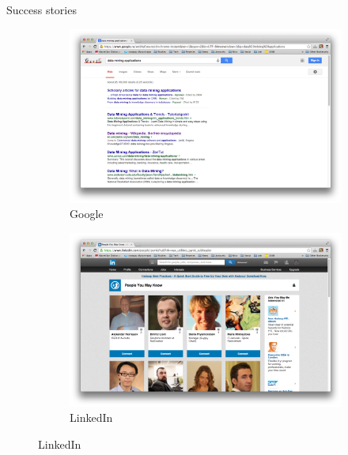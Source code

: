 \documentclass[10pt]{beamer}
\begin{document}
\begin{frame}{Success stories}

\begin{figure}
        \centering
        \begin{subfigure}[b]{0.45\textwidth}
                \includegraphics[width=\textwidth]{images/google.png}
                \caption{Google}                
        \end{subfigure}%
        \begin{subfigure}[b]{0.45\textwidth}
                \includegraphics[width=\textwidth]{images/linkedin.png}
                \caption{LinkedIn}     
        \end{subfigure}
        

\end{figure}
\end{frame}
\end{document}
